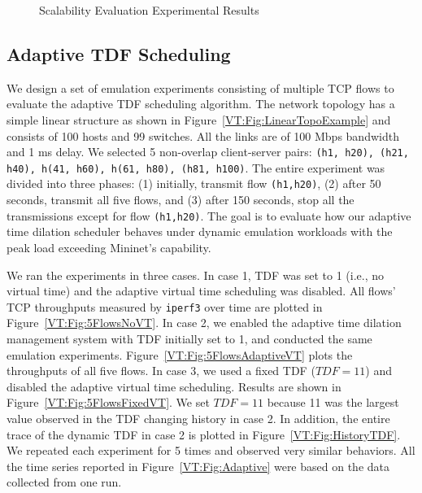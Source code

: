 \begin{figure}
    \centering
    \caption{Scalability Evaluation Experimental Results}
\end{figure}

\subsection{Adaptive TDF Scheduling}
We design a set of emulation experiments consisting of multiple TCP flows to evaluate the adaptive TDF scheduling algorithm.
The network topology has a simple linear structure as shown in Figure~\ref{VT:Fig:LinearTopoExample} and consists of 100 hosts and 99 switches.
All the links are of 100 Mbps bandwidth and 1 ms delay.
We selected 5 non-overlap client-server pairs: \texttt{(h1, h20), (h21, h40), h(41, h60), h(61, h80), (h81, h100)}.
The entire experiment was divided into three phases: (1) initially, transmit flow \texttt{(h1,h20)},
(2) after 50 seconds, transmit all five flows, and (3) after 150 seconds, stop all the transmissions except for flow \texttt{(h1,h20)}.
The goal is to evaluate how our adaptive time dilation scheduler behaves under dynamic emulation workloads with the peak load exceeding Mininet's capability.

We ran the experiments in three cases.
In case 1, TDF was set to 1 (i.e., no virtual time) and the adaptive virtual time scheduling was disabled.
All flows' TCP throughputs measured by \texttt{iperf3} over time are plotted in Figure~\ref{VT:Fig:5FlowsNoVT}. 
In case 2, we enabled the adaptive time dilation management system with TDF initially set to 1,
and conducted the same emulation experiments. Figure~\ref{VT:Fig:5FlowsAdaptiveVT} plots the throughputs of all five flows.
In case 3, we used a fixed TDF ($TDF = 11$) and disabled the adaptive virtual time scheduling.
Results are shown in Figure~\ref{VT:Fig:5FlowsFixedVT}.
We set $TDF=11$ because 11 was the largest value observed in the TDF changing history in case 2.
In addition, the entire trace of the dynamic TDF in case 2 is plotted in Figure~\ref{VT:Fig:HistoryTDF}.
We repeated each experiment for 5 times and observed very similar behaviors.
All the time series reported in Figure~\ref{VT:Fig:Adaptive} were based on the data collected from one run. 

